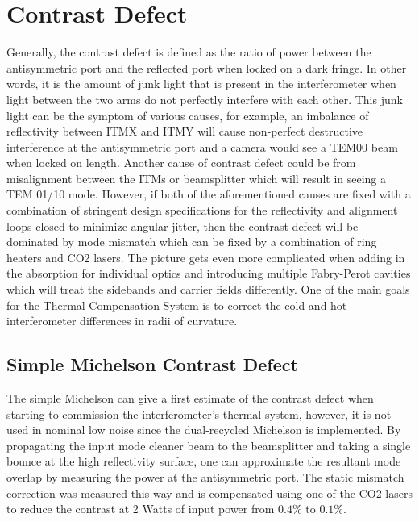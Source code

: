 	\section{Contrast Defect}
	Generally, the contrast defect is defined as the ratio of power between the antisymmetric port and the reflected port when locked on a dark fringe.  In other words, it is the amount of junk light that is present in the interferometer when light between the two arms do not perfectly interfere with each other. This junk light can be the symptom of various causes, for example, an imbalance of reflectivity between ITMX and ITMY will cause non-perfect destructive interference at the antisymmetric port and a camera would see a TEM00 beam when locked on length.  Another cause of contrast defect could be from misalignment between the ITMs or beamsplitter which will result in seeing a TEM 01/10 mode.  However, if both of the aforementioned causes are fixed with a combination of stringent design specifications for the reflectivity and alignment loops closed to minimize angular jitter, then the contrast defect will be dominated by mode mismatch which can be fixed by a combination of ring heaters and CO2 lasers.  The picture gets even more complicated when adding in the absorption for individual optics and introducing multiple Fabry-Perot cavities which will treat the sidebands and carrier fields differently.  One of the main goals for the Thermal Compensation System is to correct the cold and hot interferometer differences in radii of curvature.
	
	\subsection{Simple Michelson Contrast Defect}
	The simple Michelson can give a first estimate of the contrast defect when starting to commission the interferometer's thermal system, however, it is not used in nominal low noise since the dual-recycled Michelson is implemented.  By propagating the input mode cleaner beam to the beamsplitter and taking a single bounce at the high reflectivity surface, one can approximate the resultant mode overlap by measuring the power at the antisymmetric port.  The static mismatch correction was measured this way and is compensated using one of the CO2 lasers to reduce the contrast at 2 Watts of input power from $0.4\%$ to $0.1\%$.
	
